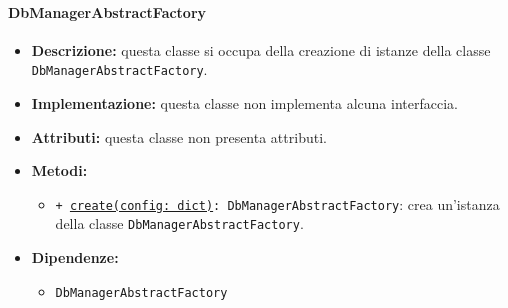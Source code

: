 \paragraph{DbManagerAbstractFactory} \label{DbManagerAbstractFactory}
\begin{itemize}
    \item \textbf{Descrizione:} questa classe si occupa della creazione di istanze della classe \texttt{DbManagerAbstractFactory}. 
    \item \textbf{Implementazione:} questa classe non implementa alcuna interfaccia. 
    \item \textbf{Attributi:} questa classe non presenta attributi.
    \item \textbf{Metodi:}
    \begin{itemize}
        \item \texttt{+ \underline{create(config: dict)}: DbManagerAbstractFactory}: crea un'istanza della classe \texttt{DbManagerAbstractFactory}.
    \end{itemize}
    \item \textbf{Dipendenze:}
    \begin{itemize}
        \item \texttt{DbManagerAbstractFactory}
    \end{itemize}
\end{itemize} 

